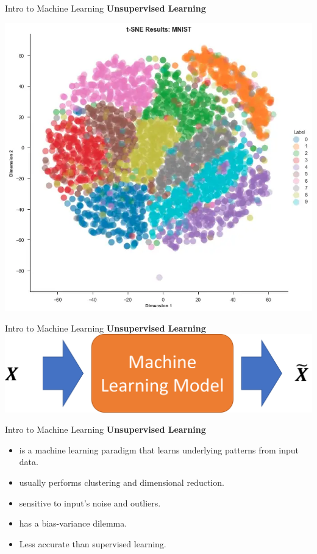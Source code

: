 \documentclass{beamer}
\begin{document}
\begin{frame}[fragile]{Intro to Machine Learning}
    \textbf{Unsupervised Learning}
    \begin{center}
        \includegraphics[width=\textwidth,height=0.7\textheight,keepaspectratio]{figures/tSNE.png}
    \end{center}
\end{frame}
\begin{frame}[fragile]{Intro to Machine Learning}
    \textbf{Unsupervised Learning}
    \includegraphics[width=\textwidth,height=\textheight,keepaspectratio]{figures/Unsupervised.png}
\end{frame}
\begin{frame}[fragile]{Intro to Machine Learning}
    \textbf{Unsupervised Learning}
    \begin{itemize}
        \item is a machine learning paradigm that learns underlying patterns from input data.
        \item usually performs clustering and dimensional reduction.
        \pause
        \item sensitive to input's noise and outliers.
        \item has a bias-variance dilemma.
        \item Less accurate than supervised learning.
    \end{itemize}
\end{frame}
\end{document}
